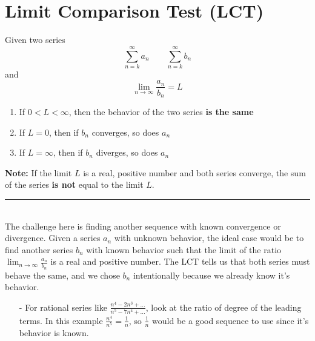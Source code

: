 \documentclass[12pt]{report}
\begin{document}
\clearpage


\section{Limit Comparison Test (LCT)}
Given two series
    $$ \sum_{n=k}^{\infty} a_n \quad \quad \sum_{n=k}^{\infty} b_n $$
and
    $$ \lim_{n\to\infty} \frac{a_n}{b_n} = L $$


\begin{enumerate}
    \item If $ 0 < L < \infty $, then the behavior of the two series \textbf{is the same}
    \item If $ L = 0 $, then if $b_n$ converges, so does $a_n$
    \item If $ L = \infty $, then if $b_n$ diverges, so does $a_n$
\end{enumerate}

\noindent \textbf{Note:} If the limit $ L $ is a real, positive number and both series converge, the sum of the series \textbf{is not} equal to the limit $ L $.


\begin{center}
    \noindent\rule{1cm}{0.4pt}
\end{center}

\noindent \\ The challenge here is finding another sequence with known convergence or divergence. Given a series $ a_n $ with unknown behavior, the ideal case would be to find another series $ b_n $ with known behavior such that the limit of the ratio $ \lim_{n\to\infty} \frac{a_n}{b_n} $ is a real and positive number. The LCT tells us that both series must behave the same, and we chose $ b_n $ intentionally because we already know it's behavior.
\begin{itemize}
    \item[-] For rational series like $\frac{n^4-2n^3+...}{n^5-7n^4+...}$, look at the ratio of degree of the leading terms. In this example $\frac{n^4}{n^5} = \frac{1}{n}$, so $\frac{1}{n}$ would be a good sequence to use since it's behavior is known. 
\end{itemize}
\end{document}
